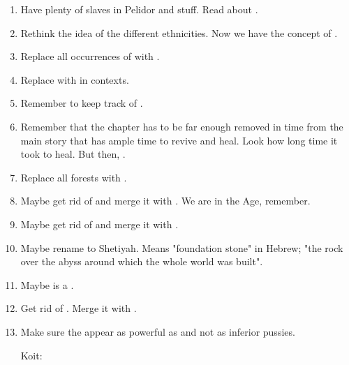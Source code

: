 \begin{enumerate}
  \item 
    Have plenty of  slaves in Pelidor and stuff. 
    Read about .
  
  \item 
    Rethink the idea of the different \scatha ethnicities.
    Now we have the concept of . 
    
  \item 
    Replace all occurrences of  with \quo{\rethyax}. 
  
  \item 
    Replace \quo{\bane} with  in \resphan contexts. 
  
  \item 
    Remember to keep track of . 
  
  \item 
    Remember that the chapter  has to be far enough removed in time from the main story that \Teshrial has ample time to revive and heal.
    Look how long time it took \Urizeth to heal. 
    But then, . 
  
  \item
    Replace all forests with . 
  
  \item 
    Maybe get rid of \GreatVelcad and merge it with \Tepharae. 
    We are in the \Scatha Age, remember.
    
  \item 
    Maybe get rid of \ClanTelcra and merge it with \ClanZether. 
    
  \item 
    Maybe rename \Miith to Shetiyah.
    Means "foundation stone" in Hebrew; "the rock over the abyss around which the whole world was built". 
    
  \item 
    Maybe \LocarPsyrex is a \quiljaar.

  \item 
    Get rid of \ClanTelcra. 
    Merge it with \ClanZether. 
  
  \item 
    Make sure the \scathae appear as powerful as \humans and not as inferior pussies. 
    
    Koit: 
    

\end{enumerate}
